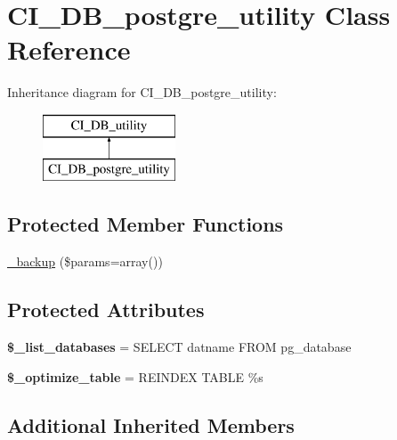\hypertarget{class_c_i___d_b__postgre__utility}{}\section{C\+I\+\_\+\+D\+B\+\_\+postgre\+\_\+utility Class Reference}
\label{class_c_i___d_b__postgre__utility}
Inheritance diagram for C\+I\+\_\+\+D\+B\+\_\+postgre\+\_\+utility\+:\begin{figure}[H]
\begin{center}
\leavevmode
\includegraphics[height=2.000000cm]{class_c_i___d_b__postgre__utility}
\end{center}
\end{figure}
\subsection*{Protected Member Functions}
\begin{DoxyCompactItemize}
\item 
\mbox{\hyperlink{class_c_i___d_b__postgre__utility_a76f759352019ba4a1fdfd8337612a40e}{\+\_\+backup}} (\$params=array())
\end{DoxyCompactItemize}
\subsection*{Protected Attributes}
\begin{DoxyCompactItemize}
\item 
\mbox{\label{class_c_i___d_b__postgre__utility_a4f154cfbd367fe81ecdb2acc81c46055}} 
{\bfseries \$\+\_\+list\+\_\+databases} = \textquotesingle{}S\+E\+L\+E\+CT datname F\+R\+OM pg\+\_\+database\textquotesingle{}
\item 
\mbox{\label{class_c_i___d_b__postgre__utility_a208e872ae01102c775122915c10451cc}} 
{\bfseries \$\+\_\+optimize\+\_\+table} = \textquotesingle{}R\+E\+I\+N\+D\+EX T\+A\+B\+LE \%s\textquotesingle{}
\end{DoxyCompactItemize}
\subsection*{Additional Inherited Members}


